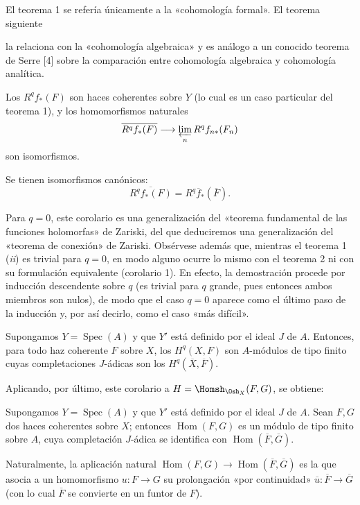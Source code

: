 El teorema 1 se refería únicamente a la «cohomología formal». El teorema siguiente

la relaciona con la «cohomología algebraica» y es análogo a un conocido teorema
de Serre [4] sobre la comparación entre cohomología algebraica y cohomología
analítica.

 Los
$R^{q}f_{*}(F)$ son haces coherentes sobre $Y$ (lo cual es un caso particular
del teorema 1), y los homomorfismos naturales
\[
  \overline{R^{q}f_{*}(F)}
  \longrightarrow \varprojlim_n R^{q}f_{n*}(F_n)
\]
son isomorfismos.

 Se tienen isomorfismos canónicos:
\[
  \overline{R^{q}f_{*}(F)}=R^{q}\overline f_{*}(\overline F).
\]

Para $q=0$, este corolario es una generalización del «teorema fundamental de
las funciones holomorfas» de Zariski, del que deduciremos una generalización del
«teorema de conexión» de Zariski. Obsérvese además que, mientras el teorema 1
(\textit{ii}) es trivial para $q=0$, en modo alguno ocurre lo mismo con el
teorema 2 ni con su formulación equivalente (corolario 1). En efecto, la
demostración procede por inducción descendente sobre $q$ (es trivial para $q$
grande, pues entonces ambos miembros son nulos), de modo que el caso $q=0$
aparece como el último paso de la inducción y, por así decirlo, como el caso «más
difícil».

 Supongamos $Y=\operatorname{Spec}(A)$ y que $Y'$ está
definido por el ideal $J$ de $A$. Entonces, para todo haz coherente $F$ sobre
$X$, los $H^{q}(X,F)$ son $A$-módulos de tipo finito cuyas completaciones
$J$-ádicas son los $H^{q}(\overline X,\overline F)$.

Aplicando, por último, este corolario a
$H=\Homsh_{\Osh_X}(F,G)$, se obtiene:

 Supongamos $Y=\operatorname{Spec}(A)$ y que $Y'$ está
definido por el ideal $J$ de $A$. Sean $F,G$ dos haces coherentes sobre $X$;
entonces $\operatorname{Hom}(F,G)$ es un módulo de tipo finito sobre $A$, cuya
completación $J$-ádica se identifica con
$\operatorname{Hom}(\overline F,\overline G)$.

Naturalmente, la aplicación natural
$\operatorname{Hom}(F,G)\longrightarrow
\operatorname{Hom}(\overline F,\overline G)$ es la que asocia a un
homomorfismo $u:F\longrightarrow G$ su prolongación «por continuidad»
$\overline u:\overline F\longrightarrow\overline G$ (con lo cual
$\overline F$ se convierte en un funtor de $F$).

